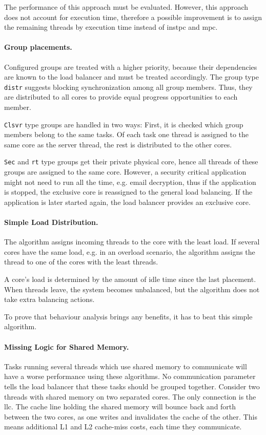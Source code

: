 The performance of this approach must be evaluated.
However, this approach does not account for execution time, therefore a
possible improvement is to assign the remaining threads by execution time
instead of \gls{instpc} and \gls{mpc}.


\paragraph{Group placements.}
Configured groups are treated with a higher priority, because their
dependencies are known to the load balancer and must be treated accordingly.
The group type \texttt{distr} suggests blocking synchronization among all group
members.
Thus, they are distributed to all cores to provide equal progress opportunities
to each member.

\texttt{Clsvr} type groups are handled in two ways: First, it is checked which
group members belong to the same tasks.
Of each task one thread is assigned to the same core as the server thread, the
rest is distributed to the other cores.

\texttt{Sec} and \texttt{rt} type groups get their private physical core, hence
all threads of these groups are assigned to the same core.
However, a security critical application might not need to run all the time,
e.g. email decryption, thus if the application is stopped, the exclusive core
is reassigned to the general load balancing.
If the application is later started again, the load balancer provides an
exclusive core.


\paragraph{Simple Load Distribution.}
The algorithm assigns incoming threads to the core with the least load.
If several cores have the same load, e.g. in an overload scenario, the
algorithm assigns the thread to one of the cores with the least threads.

A core's load is determined by the amount of idle time since the last
placement.
When threads leave, the system becomes unbalanced, but the algorithm does not
take extra balancing actions.

To prove that behaviour analysis brings any benefits, it has to beat
this simple algorithm.


\paragraph{Missing Logic for Shared Memory.}
Tasks running several threads which use shared memory to communicate will have
a worse performance using these algorithms.
No communication parameter tells the load balancer that these tasks should be
grouped together.
Consider two threads with shared memory on two separated cores.
The only connection is the \gls{llc}.
The cache line holding the shared memory will bounce back and forth between
the two cores, as one writes and invalidates the cache of the other.
This means additional L1 and L2 cache-miss costs, each time they communicate.


